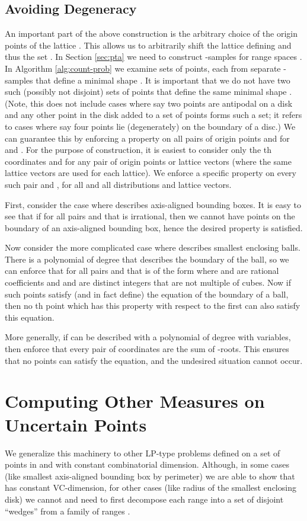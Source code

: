 \documentclass{journal}
\begin{document}
\subsection{Avoiding Degeneracy}
An important part of the above construction is the arbitrary choice of the origin points of the lattice .  This allows us to arbitrarily shift the lattice defining  and thus the set .  In Section \ref{sec:pta} we need to construct  -samples  for  range spaces .
In Algorithm \ref{alg:count-prob} we examine sets of  points, each from separate -samples that define a minimal shape .  It is important that we do not have two such (possibly not disjoint) sets of  points that define the same minimal shape .  (Note, this does not include cases where say two points are antipodal on a disk and any other point in the disk added to a set of  points forms such a set; it refers to cases where say four points lie (degenerately) on the boundary of a disc.)
We can guarantee this by enforcing a property on all pairs of origin points  and  for  and .  For the purpose of construction, it is easiest to consider only the th coordinates  and  for any pair of origin points or lattice vectors (where the same lattice vectors are used for each lattice).  We enforce a specific property on every such pair  and , for all  and all distributions and lattice vectors.

First, consider the case where  describes axis-aligned bounding boxes.  It is easy to see that if for all pairs  and  that  is irrational, then we cannot have  points on the boundary of an axis-aligned bounding box, hence the desired property is satisfied.

Now consider the more complicated case where  describes smallest enclosing balls.  There is a polynomial of degree  that describes the boundary of the ball, so we can enforce that for all pairs  and  that  is of the form  where  and  are rational coefficients and  and  are distinct integers that are not multiple of cubes.    Now if  such points satisfy (and in fact define) the equation of the boundary of a ball, then no th point which has this property with respect to the first  can also satisfy this equation.

More generally, if  can be described with a polynomial of degree  with  variables, then enforce that every pair of coordinates are the sum of -roots.  This ensures that no  points can satisfy the equation, and the undesired situation cannot occur.



\section {Computing Other Measures on Uncertain Points}
\label {app:moreexamples}
We generalize this machinery to other LP-type problems  defined on a set of points in  and with constant combinatorial dimension.  Although, in some cases (like smallest axis-aligned bounding box by perimeter) we are able to show that  has constant VC-dimension, for other cases (like radius of the smallest enclosing disk) we cannot and need to first decompose each range  into a set of disjoint ``wedges'' from a family of ranges .
\end{document}
